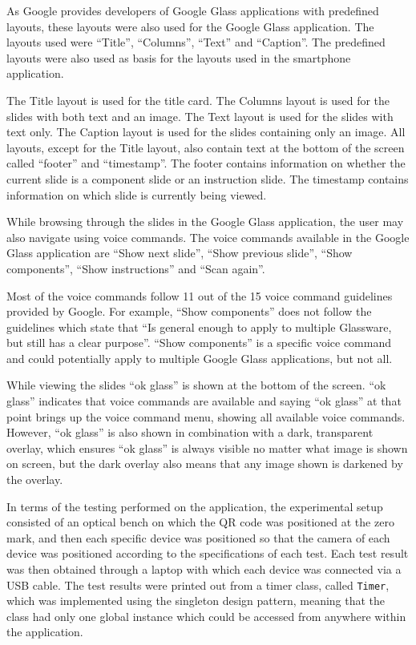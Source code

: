 As Google provides developers of Google Glass applications with predefined layouts, these layouts were also used for the Google Glass application. The layouts used were ``Title'', ``Columns'', ``Text'' and ``Caption''. The predefined layouts were also used as basis for the layouts used in the smartphone application.

The Title layout is used for the title card. The Columns layout is used for the slides with both text and an image. The Text layout is used for the slides with text only. The Caption layout is used for the slides containing only an image. All layouts, except for the Title layout, also contain text at the bottom of the screen called ``footer'' and ``timestamp''. The footer contains information on whether the current slide is a component slide or an instruction slide. The timestamp contains information on which slide is currently being viewed.

While browsing through the slides in the Google Glass application, the user may also navigate using voice commands. The voice commands available in the Google Glass application are ``Show next slide'', ``Show previous slide'', ``Show components'', ``Show instructions'' and ``Scan again''.

Most of the voice commands follow 11 out of the 15 voice command guidelines provided by Google. For example, ``Show components'' does not follow the guidelines which state that ``Is general enough to apply to multiple Glassware, but still has a clear purpose''. ``Show components'' is a specific voice command and could potentially apply to multiple Google Glass applications, but not all.

While viewing the slides ``ok glass'' is shown at the bottom of the screen. ``ok glass'' indicates that voice commands are available and saying ``ok glass'' at that point brings up the voice command menu, showing all available voice commands. However, ``ok glass'' is also shown in combination with a dark, transparent overlay, which ensures ``ok glass'' is always visible no matter what image is shown on screen, but the dark overlay also means that any image shown is darkened by the overlay.

In terms of the testing performed on the application, the experimental setup consisted of an optical bench on which the QR code was positioned at the zero mark, and then each specific device was positioned so that the camera of each device was positioned according to the specifications of each test. Each test result was then obtained through a laptop with which each device was connected via a USB cable. The test results were printed out from a timer class, called \texttt{Timer}, which was implemented using the singleton design pattern, meaning that the class had only one global instance which could be accessed from anywhere within the application.


